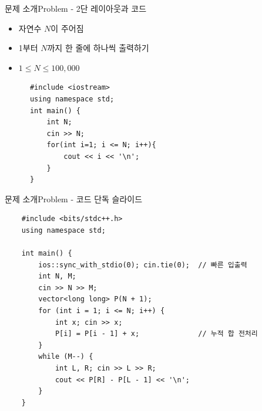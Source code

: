 
\begin{frame}[fragile]{문제 소개}{Problem - 2단 레이아웃과 코드}
  \begin{center}
  \end{center}
  \vspace{3mm}
  \begin{twocol}
    \begin{itemize}
      \item 자연수 $N$이 주어짐
      \item 1부터 $N$까지 한 줄에 하나씩 출력하기
    \end{itemize}
    \vspace{3mm}
    \begin{itemize}
      \item $1 \le N \le 100{,}000$
    \end{itemize}
  \colsplit
    \begin{verbatim}
      #include <iostream>
      using namespace std;
      int main() {
          int N;
          cin >> N;
          for(int i=1; i <= N; i++){
              cout << i << '\n';
          }
      }
    \end{verbatim}
  \end{twocol}
\end{frame}

\begin{frame}[fragile]{문제 소개}{Problem - 코드 단독 슬라이드}
  \begin{verbatim}
    #include <bits/stdc++.h>
    using namespace std;

    int main() {
        ios::sync_with_stdio(0); cin.tie(0);  // 빠른 입출력
        int N, M;
        cin >> N >> M;
        vector<long long> P(N + 1);
        for (int i = 1; i <= N; i++) {
            int x; cin >> x;
            P[i] = P[i - 1] + x;              // 누적 합 전처리
        }
        while (M--) {
            int L, R; cin >> L >> R;
            cout << P[R] - P[L - 1] << '\n';
        }
    }
  \end{verbatim}
\end{frame}


